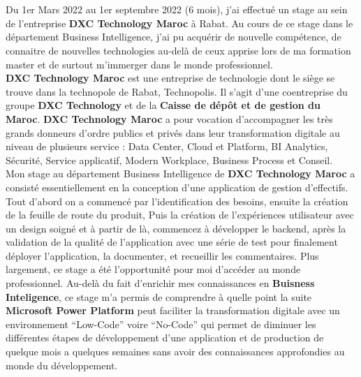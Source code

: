 \titlespacing*{\chapter}{0pt}{0in}{0.3in}
\chapter*{}
\titlespacing*{\chapter}{0pt}{0.45in}{0.3in}%

Du 1er Mars 2022 au 1er septembre 2022 (6 mois), j’ai effectué un stage au sein de l’entreprise \textbf{DXC Technology Maroc} à Rabat. Au cours de ce stage dans le département Business Intelligence, j'ai pu acquérir de nouvelle compétence, de connaitre de nouvelles technologies au-delà de ceux apprise lors de ma formation master et de surtout m'immerger dans le monde professionnel. \\ 

\textbf{DXC Technology Maroc} est une entreprise de technologie dont le siège se trouve dans la technopole de Rabat, Technopolis. Il s’agit d’une coentreprise du groupe \textbf{DXC Technology} et de la \textbf{Caisse de dépôt et de gestion du Maroc}. \textbf{DXC Technology Maroc} a pour vocation d’accompagner les très grands donneurs d’ordre publics et privés dans leur transformation digitale au niveau de plusieurs service : Data Center, Cloud et Platform, BI Analytics, Sécurité, Service applicatif, Modern Workplace, Business Process et Conseil.\\ 

Mon stage au département Business Intelligence de \textbf{DXC Technology Maroc} a consisté essentiellement en la conception d'une application de gestion d'effectifs. Tout d'abord on a commencé par l'identification des besoins, ensuite la création de la feuille de route du produit, Puis la création de l'expériences utilisateur avec un design soigné et à partir de là, commencez à développer le backend, après la validation de la qualité de l'application avec une série de test pour finalement déployer l'application, la documenter, et recueillir les commentaires. Plus largement, ce stage a été l’opportunité pour moi d'accéder au monde professionnel. Au-delà du fait d’enrichir mes connaissances en \textbf{Buisness Inteligence}, ce stage m’a permis de comprendre à quelle point la suite \textbf{Microsoft Power Platform} peut faciliter la transformation digitale avec un environnement “Low-Code” voire “No-Code” qui permet de diminuer les différentes étapes de développement d'une application et de production de quelque mois a quelques semaines sans avoir des connaissances approfondies au monde du développement.\\

